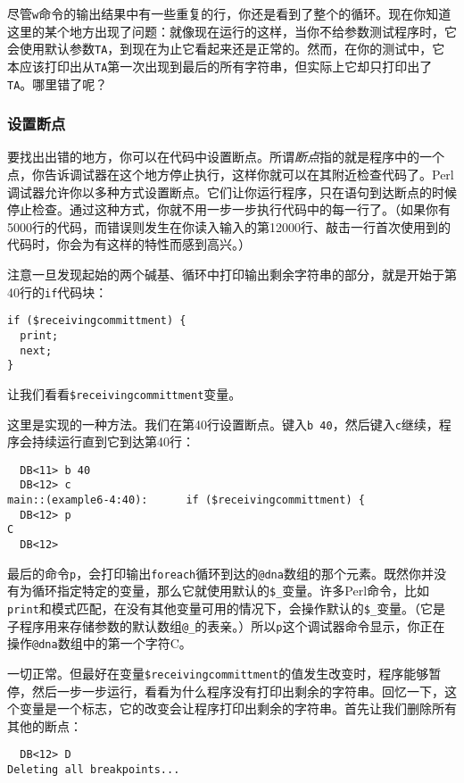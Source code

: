 尽管\verb|w|命令的输出结果中有一些重复的行，你还是看到了整个的循环。现在你知道这里的某个地方出现了问题：就像现在运行的这样，当你不给参数测试程序时，它会使用默认参数\verb|TA|，到现在为止它看起来还是正常的。然而，在你的测试中，它本应该打印出从\verb|TA|第一次出现到最后的所有字符串，但实际上它却只打印出了\verb|TA|。哪里错了呢？

\subsubsection{设置断点}
要找出出错的地方，你可以在代码中设置断点。所谓\textit{断点}指的就是程序中的一个点，你告诉调试器在这个地方停止执行，这样你就可以在其附近检查代码了。Perl调试器允许你以多种方式设置断点。它们让你运行程序，只在语句到达断点的时候停止检查。通过这种方式，你就不用一步一步执行代码中的每一行了。（如果你有5000行的代码，而错误则发生在你读入输入的第12000行、敲击一行首次使用到的代码时，你会为有这样的特性而感到高兴。）

注意一旦发现起始的两个碱基、循环中打印输出剩余字符串的部分，就是开始于第40行的\verb|if|代码块：

\begin{lstlisting}
if ($receivingcommittment) {
  print;
  next;
}
\end{lstlisting}

让我们看看\verb|$receivingcommittment|变量。

这里是实现的一种方法。我们在第40行设置断点。键入\verb|b 40|，然后键入\verb|c|继续，程序会持续运行直到它到达第40行：

\begin{lstlisting}
  DB<11> b 40
  DB<12> c
main::(example6-4:40):      if ($receivingcommittment) {
  DB<12> p
C
  DB<12> 
\end{lstlisting}

最后的命令\verb|p|，会打印输出\verb|foreach|循环到达的\verb|@dna|数组的那个元素。既然你并没有为循环指定特定的变量，那么它就使用默认的\verb|$_|变量。许多Perl命令，比如\verb|print|和模式匹配，在没有其他变量可用的情况下，会操作默认的\verb|$_|变量。（它是子程序用来存储参数的默认数组\verb|@_|的表亲。）所以\verb|p|这个调试器命令显示，你正在操作\verb|@dna|数组中的第一个字符C。

一切正常。但最好在变量\verb|$receivingcommittment|的值发生改变时，程序能够暂停，然后一步一步运行，看看为什么程序没有打印出剩余的字符串。回忆一下，这个变量是一个标志，它的改变会让程序打印出剩余的字符串。首先让我们删除所有其他的断点：

\begin{lstlisting}
  DB<12> D
Deleting all breakpoints...
\end{lstlisting}

